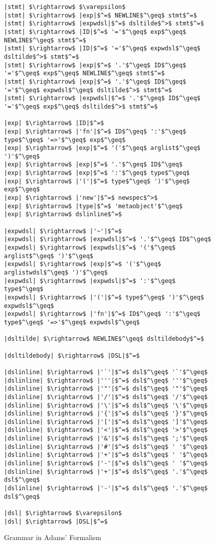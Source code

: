 
\begin{figure}
\begin{lstlisting}[mathescape]
|stmt| $\rightarrow$ $\varepsilon$
|stmt| $\rightarrow$ |exp|$^=$ NEWLINE$^\geq$ stmt$^=$
|stmt| $\rightarrow$ |expwdsl|$^=$ dsltilde$^>$ stmt$^=$
|stmt| $\rightarrow$ |ID|$^=$ '='$^\geq$ exp$^\geq$ NEWLINE$^\geq$ stmt$^=$
|stmt| $\rightarrow$ |ID|$^=$ '='$^\geq$ expwdsl$^\geq$ dsltilde$^>$ stmt$^=$
|stmt| $\rightarrow$ |exp|$^=$ '.'$^\geq$ ID$^\geq$ '='$^\geq$ exp$^\geq$ NEWLINE$^\geq$ stmt$^=$
|stmt| $\rightarrow$ |exp|$^=$ '.'$^\geq$ ID$^\geq$ '='$^\geq$ expwdsl$^\geq$ dsltilde$^>$ stmt$^=$
|stmt| $\rightarrow$ |expwdsl|$^=$ '.'$^\geq$ ID$^\geq$ '='$^\geq$ exp$^\geq$ dsltilde$^>$ stmt$^=$

|exp| $\rightarrow$ |ID|$^=$
|exp| $\rightarrow$ |'fn'|$^=$ ID$^\geq$ ':'$^\geq$ type$^\geq$ '=>'$^\geq$ exp$^\geq$
|exp| $\rightarrow$ |exp|$^=$ '('$^\geq$ arglist$^\geq$ ')'$^\geq$
|exp| $\rightarrow$ |exp|$^=$ '.'$^\geq$ ID$^\geq$
|exp| $\rightarrow$ |exp|$^=$ ':'$^\geq$ type$^\geq$
|exp| $\rightarrow$ |'('|$^=$ type$^\geq$ ')'$^\geq$ exp$^\geq$
|exp| $\rightarrow$ |'new'|$^=$ newspec$^>$
|exp| $\rightarrow$ |type|$^=$ 'metaobject'$^\geq$
|exp| $\rightarrow$ dslinline$^=$

|expwdsl| $\rightarrow$ |'~'|$^=$
|expwdsl| $\rightarrow$ |expwdsl|$^=$ '.'$^\geq$ ID$^\geq$
|expwdsl| $\rightarrow$ |expwdsl|$^=$ '('$^\geq$ arglist$^\geq$ ')'$^\geq$
|expwdsl| $\rightarrow$ |exp|$^=$ '('$^\geq$ arglistwdsl$^\geq$ ')'$^\geq$
|expwdsl| $\rightarrow$ |expwdsl|$^=$ ':'$^\geq$ type$^\geq$
|expwdsl| $\rightarrow$ |'('|$^=$ type$^\geq$ ')'$^\geq$ expwdsl$^\geq$
|expwdsl| $\rightarrow$ |'fn'|$^=$ ID$^\geq$ ':'$^\geq$ type$^\geq$ '=>'$^\geq$ expwdsl$^\geq$

|dsltilde| $\rightarrow$ NEWLINE$^\geq$ dsltildebody$^=$

|dsltildebody| $\rightarrow$ |DSL|$^=$

|dslinline| $\rightarrow$ |'`'|$^=$ dsl$^\geq$ '`'$^\geq$
|dslinline| $\rightarrow$ |'''|$^=$ dsl$^\geq$ '''$^\geq$
|dslinline| $\rightarrow$ |'"'|$^=$ dsl$^\geq$ '"'$^\geq$
|dslinline| $\rightarrow$ |'/'|$^=$ dsl$^\geq$ '/'$^\geq$
|dslinline| $\rightarrow$ |'\'|$^=$ dsl$^\geq$ '\'$^\geq$
|dslinline| $\rightarrow$ |'{'|$^=$ dsl$^\geq$ '}'$^\geq$
|dslinline| $\rightarrow$ |'['|$^=$ dsl$^\geq$ ']'$^\geq$
|dslinline| $\rightarrow$ |'<'|$^=$ dsl$^\geq$ '>'$^\geq$
|dslinline| $\rightarrow$ |'&'|$^=$ dsl$^\geq$ ';'$^\geq$
|dslinline| $\rightarrow$ |'#'|$^=$ dsl$^\geq$ ' '$^\geq$
|dslinline| $\rightarrow$ |'+'|$^=$ dsl$^\geq$ ' '$^\geq$
|dslinline| $\rightarrow$ |'-'|$^=$ dsl$^\geq$ ' '$^\geq$
|dslinline| $\rightarrow$ |'+'|$^=$ dsl$^\geq$ '.'$^\geq$ dsl$^\geq$
|dslinline| $\rightarrow$ |'-'|$^=$ dsl$^\geq$ '.'$^\geq$ dsl$^\geq$

|dsl| $\rightarrow$ $\varepsilon$
|dsl| $\rightarrow$ |DSL|$^=$
\end{lstlisting}
\caption{Grammar in Adams' Formalism}
\label{f-grammar}
\end{figure}
